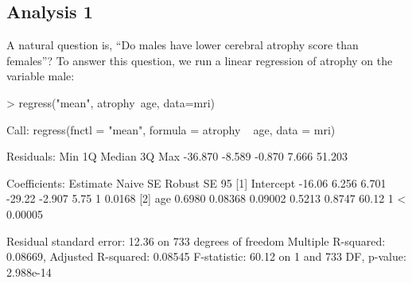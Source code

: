 \documentclass[landscape]{article}
\renewenvironment{Schunk}{\vspace{\topsep}}{\vspace{\topsep}}
\begin{document}
\subsection{Analysis 1}
A natural question is, ``Do males have lower cerebral atrophy score than females''? To answer this question, we run a linear regression of atrophy on the variable male:
\begin{Schunk}
\begin{Sinput}
> regress("mean", atrophy~age, data=mri)
\end{Sinput}
\begin{Soutput}
Call:
regress(fnctl = "mean", formula = atrophy ~ age, data = mri)

Residuals:
    Min      1Q  Median      3Q     Max 
-36.870  -8.589  -0.870   7.666  51.203 

Coefficients:
                 Estimate  Naive SE  Robust SE    95%L      95%H         F stat    df Pr(>F)   
[1] Intercept     -16.06     6.256     6.701       -29.22    -2.907           5.75 1    0.0168 
[2] age            0.6980   0.08368   0.09002       0.5213    0.8747         60.12 1  < 0.00005

Residual standard error: 12.36 on 733 degrees of freedom
Multiple R-squared:  0.08669,	Adjusted R-squared:  0.08545 
F-statistic: 60.12 on 1 and 733 DF,  p-value: 2.988e-14
\end{Soutput}
\end{Schunk}
\end{document}
